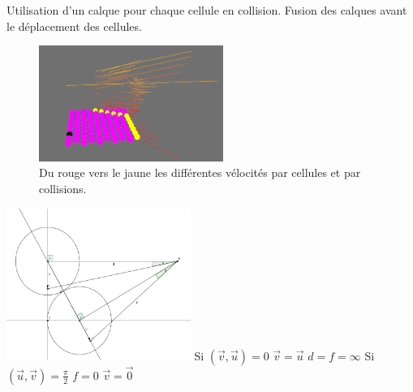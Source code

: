 \documentclass{beamer}
\begin{document}
\begin{frame}
  Utilisation d'un calque pour chaque cellule en collision. Fusion des calques avant le déplacement des cellules.
  \begin{figure}
    \begin{center}
      \includegraphics[width=6cm]{Images/calque.png}
    \end{center}
    \caption{Du rouge vers le jaune les différentes vélocités par cellules et par collisions.}
  \end{figure}
\end{frame}

\begin{frame}
  \begin{multicols}{2}
    \includegraphics[width=6cm]{Images/geogebra_2.png}
    \vfill
    \columnbreak
    Si $(\overrightarrow{v}, \overrightarrow{u}) = 0$ \smallbreak
    $\overrightarrow{v} = \overrightarrow{u}$ \smallbreak
    $d = f = \infty$ \smallbreak
    Si $(\overrightarrow{u}, \overrightarrow{v}) = \frac{\pi}{2}$ \smallbreak
    $f = 0$ \smallbreak
    $\overrightarrow{v} = \overrightarrow{0}$
  \end{multicols}
\end{frame}
\end{document}
